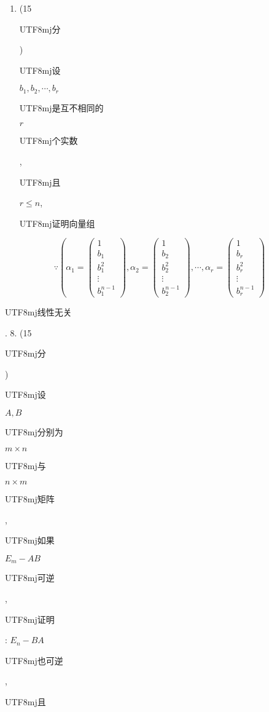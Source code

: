\documentclass[10pt]{article}
\begin{document}
\begin{enumerate}
  \item (15 \begin{CJK}{UTF8}{mj}分\end{CJK}) \begin{CJK}{UTF8}{mj}设\end{CJK} $b_{1}, b_{2}, \cdots, b_{r}$ \begin{CJK}{UTF8}{mj}是互不相同的\end{CJK} $r$ \begin{CJK}{UTF8}{mj}个实数\end{CJK}, \begin{CJK}{UTF8}{mj}且\end{CJK} $r \leq n$, \begin{CJK}{UTF8}{mj}证明向量组\end{CJK}

\end{enumerate}
$$
\because\left(\alpha_{1}=\left(\begin{array}{c}
1 \\
b_{1} \\
b_{1}^{2} \\
\vdots \\
b_{1}^{n-1}
\end{array}\right), \alpha_{2}=\left(\begin{array}{c}
1 \\
b_{2} \\
b_{2}^{2} \\
\vdots \\
b_{2}^{n-1}
\end{array}\right), \cdots, \alpha_{r}=\left(\begin{array}{c}
1 \\
b_{r} \\
b_{r}^{2} \\
\vdots \\
b_{r}^{n-1}
\end{array}\right)\right.
$$
\begin{CJK}{UTF8}{mj}线性无关\end{CJK}. 8. (15 \begin{CJK}{UTF8}{mj}分\end{CJK}) \begin{CJK}{UTF8}{mj}设\end{CJK} $A, B$ \begin{CJK}{UTF8}{mj}分别为\end{CJK} $m \times n$ \begin{CJK}{UTF8}{mj}与\end{CJK} $n \times m$ \begin{CJK}{UTF8}{mj}矩阵\end{CJK}, \begin{CJK}{UTF8}{mj}如果\end{CJK} $E_{m}-A B$ \begin{CJK}{UTF8}{mj}可逆\end{CJK}, \begin{CJK}{UTF8}{mj}证明\end{CJK}: $E_{n}-B A$ \begin{CJK}{UTF8}{mj}也可逆\end{CJK}, \begin{CJK}{UTF8}{mj}且\end{CJK}
\end{document}
